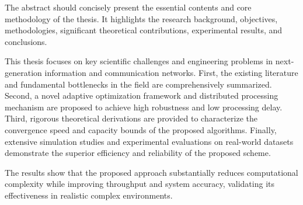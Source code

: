 
\begin{enabstract}
The abstract should concisely present the essential contents and core methodology of the thesis. It highlights the research background, objectives, methodologies, significant theoretical contributions, experimental results, and conclusions.

This thesis focuses on key scientific challenges and engineering problems in next-generation information and communication networks. First, the existing literature and fundamental bottlenecks in the field are comprehensively summarized. Second, a novel adaptive optimization framework and distributed processing mechanism are proposed to achieve high robustness and low processing delay. Third, rigorous theoretical derivations are provided to characterize the convergence speed and capacity bounds of the proposed algorithms. Finally, extensive simulation studies and experimental evaluations on real-world datasets demonstrate the superior efficiency and reliability of the proposed scheme.

The results show that the proposed approach substantially reduces computational complexity while improving throughput and system accuracy, validating its effectiveness in realistic complex environments.

\end{enabstract}
